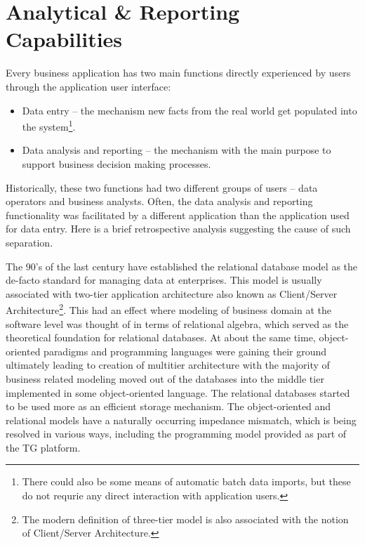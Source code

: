 \section{Analytical \& Reporting Capabilities}\label{sec:06}
  Every business application has two main functions directly experienced by users through the application user interface:
  \begin{itemize}
   \item Data entry -- the mechanism new facts from the real world get populated into the system\footnote{There could also be some means of automatic batch data imports, but these do not requrie any direct interaction with application users.}.
   \item Data analysis and reporting -- the mechanism with the main purpose to support business decision making processes.
  \end{itemize}
  Historically, these two functions had two different groups of users -- data operators and business analysts.
  Often, the data analysis and reporting functionality was facilitated by a different application than the application used for data entry.
  Here is a brief retrospective analysis suggesting the cause of such separation.
  
  The 90's of the last century have established the relational database model as the de-facto standard for managing data at enterprises.
  This model is usually associated with two-tier application architecture also known as Client/Server Architecture\footnote{The modern definition of three-tier model is also associated with the notion of Client/Server Architecture.}.
  This had an effect where modeling of business domain at the software level was thought of in terms of relational algebra, which served as the theoretical foundation for relational databases.
  At about the same time, object-oriented paradigms and programming languages were gaining their ground ultimately leading to creation of multitier architecture with the majority of business related modeling moved out of the databases into the middle tier implemented in some object-oriented language.
  The relational databases started to be used more as an efficient storage mechanism.
  The object-oriented and relational models have a naturally occurring impedance mismatch, which is being resolved in various ways, including the programming model provided as part of the TG platform.
  
